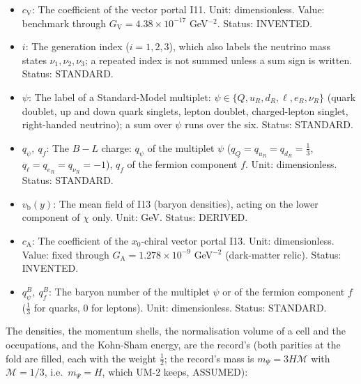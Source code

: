 \documentclass[
  10pt,
]{article}
\begin{document}
\begin{itemize}
  density of the Standard-Model fermion \(\psi_i\) (per proper 7-volume
  of eight dimensions); \(n_f\) the density of the fermion component
  \(f\) and \(n_i\) that of the neutrino mass state \(i\) (per 3-volume
  of four dimensions). Unit: \(\mathrm{GeV}^{7}\) (eight dimensions),
  \(\mathrm{GeV}^{3}\) (four dimensions). Status: STANDARD.
\item
  \(c_{\mathrm{V}}\): The coefficient of the vector portal I11. Unit:
  dimensionless. Value: benchmark through
  \(G_{\mathrm{V}} = 4.38\times10^{-17}\) GeV\(^{-2}\). Status:
  INVENTED.
\item
  \(i\): The generation index (\(i = 1, 2, 3\)), which also labels the
  neutrino mass states \(\nu_1, \nu_2, \nu_3\); a repeated index is not
  summed unless a sum sign is written. Status: STANDARD.
\item
  \(\psi\): The label of a Standard-Model multiplet:
  \(\psi \in \{Q, u_R, d_R, \ell, e_R, \nu_R\}\) (quark doublet, up and
  down quark singlets, lepton doublet, charged-lepton singlet,
  right-handed neutrino); a sum over \(\psi\) runs over the six. Status:
  STANDARD.
\item
  \(q_\psi,\ q_f\): The \(B - L\) charge: \(q_\psi\) of the multiplet
  \(\psi\) (\(q_Q = q_{u_R} = q_{d_R} = \frac13\),
  \(q_\ell = q_{e_R} = q_{\nu_R} = -1\)), \(q_f\) of the fermion
  component \(f\). Unit: dimensionless. Status: STANDARD.
\item
  \(v_{\mathrm{b}}(y)\): The mean field of I13 (baryon densities),
  acting on the lower component of \(\chi\) only. Unit: GeV. Status:
  DERIVED.
\item
  \(c_{\mathrm{A}}\): The coefficient of the \(x_0\)-chiral vector
  portal I13. Unit: dimensionless. Value: fixed through
  \(G_{\mathrm{A}} = 1.278\times10^{-9}\) GeV\(^{-2}\) (dark-matter
  relic). Status: INVENTED.
\item
  \(q^B_\psi,\ q^B_f\): The baryon number of the multiplet \(\psi\) or
  of the fermion component \(f\) (\(\frac13\) for quarks, 0 for
  leptons). Unit: dimensionless. Status: STANDARD.
\end{itemize}

The densities, the momentum shells, the normalisation volume of a cell
and the occupations, and the Kohn-Sham energy, are the record's (both
parities at the fold are filled, each with the weight \(\frac12\); the
record's mass is \(m_\Psi = 3H\mathcal{M}\) with \(\mathcal{M} = 1/3\),
i.e.~\(m_\Psi = H\), which UM-2 keeps, ASSUMED):
\end{document}
